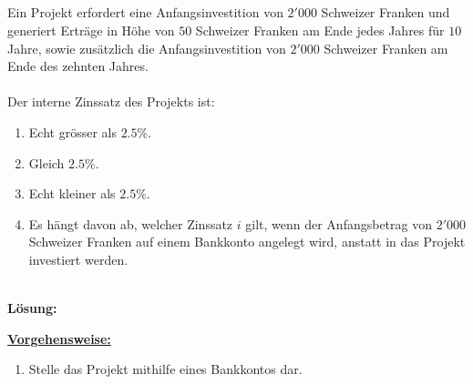 \subsection*{}
Ein Projekt erfordert eine Anfangsinvestition von $2'000$ Schweizer Franken und generiert Erträge in Höhe von $50$ Schweizer Franken am Ende jedes Jahres für $10$ Jahre, sowie zusätzlich die Anfangsinvestition von $2'000$ Schweizer Franken am Ende des zehnten Jahres.\\
\\
Der interne Zinssatz des Projekts ist:
\renewcommand{\labelenumi}{(\alph{enumi})}
\begin{enumerate}
	\item 
	Echt grösser als $2.5 \%$.
	\item 
	Gleich $2.5 \%$.
	\item
	Echt kleiner als $2.5 \%$.
	\item
	Es hängt davon ab, welcher Zinssatz $i$ gilt, wenn der Anfangsbetrag von $2'000$ Schweizer Franken auf einem Bankkonto angelegt wird, anstatt in das Projekt investiert werden.
\end{enumerate}
\ \\
\textbf{Lösung:}
\begin{mdframed}
\underline{\textbf{Vorgehensweise:}}
\renewcommand{\labelenumi}{\theenumi.}
\begin{enumerate}
\item Stelle das Projekt mithilfe eines Bankkontos dar.
\end{enumerate}
\end{mdframed}

